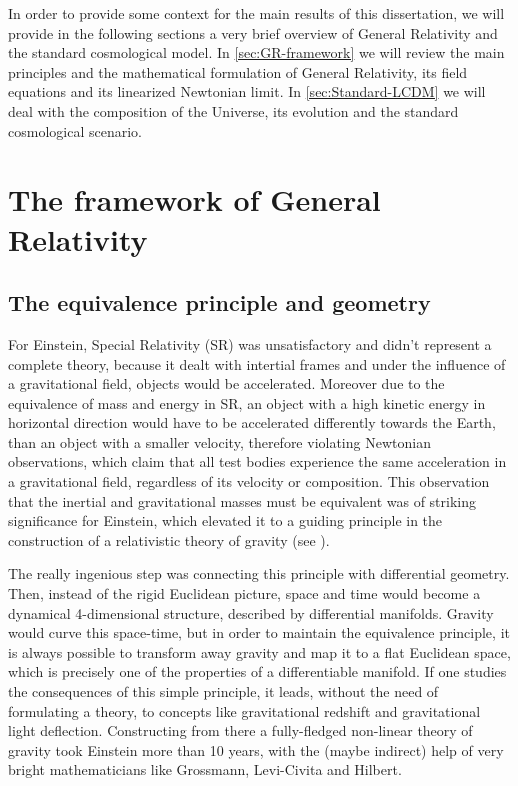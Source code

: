 In order to provide some context for the main results of this dissertation, we will
provide in the following sections a very brief overview of General Relativity and 
the standard cosmological model. 
In \cref{sec:GR-framework} we will review the main principles and the mathematical 
formulation of General Relativity, its field equations and
its linearized Newtonian limit.
In \cref{sec:Standard-LCDM} we will deal with the composition of the Universe,
its evolution and the standard cosmological scenario.


\section{The framework of General Relativity \label{sec:GR-framework}}

\subsection{The equivalence principle and geometry}

For Einstein, Special Relativity (SR) was unsatisfactory and didn't represent a complete theory, because it dealt with 
intertial frames and under the influence of
a gravitational field, objects would be accelerated. Moreover due to the equivalence of mass and energy in SR, 
an object with a high kinetic energy in horizontal direction would have to be accelerated differently towards the Earth, than an object
with a smaller velocity, therefore violating Newtonian observations, which claim that all test bodies experience
the same acceleration in a gravitational field, regardless of its velocity or composition.
This observation that the inertial and gravitational masses must be equivalent was of striking significance for Einstein, 
which elevated it to a guiding principle in the construction of a relativistic theory of gravity (see \cite{pais, wald, bartelmann}).

The really ingenious step was connecting this principle with differential geometry. Then, instead of the rigid 
Euclidean picture, space and time would become a dynamical 4-dimensional structure, described by differential manifolds.
Gravity would curve this space-time, but in order to maintain the equivalence principle, it is always possible to transform away gravity 
and map it to a flat Euclidean space, which is precisely one of the properties of a differentiable manifold.
If one studies the consequences of this simple principle, it leads, without the need of formulating a theory, 
to concepts like gravitational redshift and gravitational light deflection. 
Constructing from there a fully-fledged non-linear theory of gravity took Einstein more than 10 years, with the (maybe indirect) help
of very bright mathematicians like Grossmann, Levi-Civita and Hilbert.


